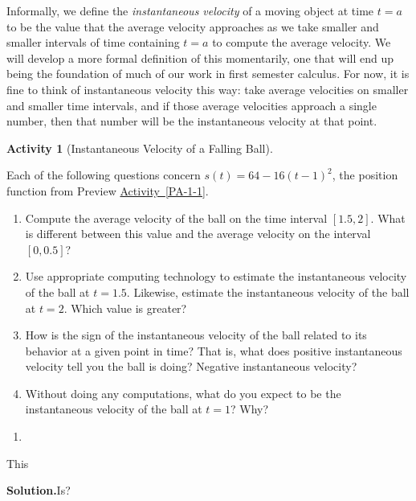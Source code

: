 \documentclass[10pt,]{book}
\theoremstyle{plain}
\theoremstyle{definition}
\theoremstyle{definition}
\theoremstyle{definition}
\theoremstyle{definition}
\newtheorem{activity}[project]{Activity}
\theoremstyle{definition}
\numberwithin{equation}{section}
\begin{document}
Informally, we define the \emph{instantaneous velocity}\index{} of a moving object at time \(t = a\) to be the value that the average velocity approaches as we take smaller and smaller intervals of time containing \(t = a\) to compute the average velocity. We will develop a more formal definition of this momentarily, one that will end up being the foundation of much of our work in first semester calculus. For now, it is fine to think of instantaneous velocity this way: take average velocities on smaller and smaller time intervals, and if those average velocities approach a single number, then that number will be the instantaneous velocity at that point.
%
\begin{activity}[Instantaneous Velocity of a Falling Ball]\label{act-1-1-2}

        Each of the following questions concern \(s(t) = 64 - 16(t-1)^2\), the position function from Preview \hyperref[PA-1-1]{Activity~\ref{PA-1-1}}.
\leavevmode%
\begin{enumerate}[label=\alph*]
\item\hypertarget{li-16}{}Compute the average velocity of the ball on the time interval \([1.5,2]\).  What is different between this value and the average velocity on the interval \([0,0.5]\)?%
\item\hypertarget{li-17}{}Use appropriate computing technology to estimate the instantaneous velocity of the ball at \(t = 1.5\).  Likewise, estimate the instantaneous velocity of the ball at \(t = 2\).  Which value is greater?%
\item\hypertarget{li-18}{}How is the sign of the instantaneous velocity of the ball related to its behavior at a given point in time?  That is, what does positive instantaneous velocity tell you the ball is doing?  Negative instantaneous velocity?%
\item\hypertarget{li-19}{}Without doing any computations, what do you expect to be the instantaneous velocity of the ball at \(t = 1\)?  Why?%
\end{enumerate}
\leavevmode%
\begin{enumerate}
\item\hypertarget{li-20}{}%
\end{enumerate}
 This %
\par\medskip\noindent%
\textbf{Solution.}\quad  Is? %
\end{activity}
\par
\end{document}
